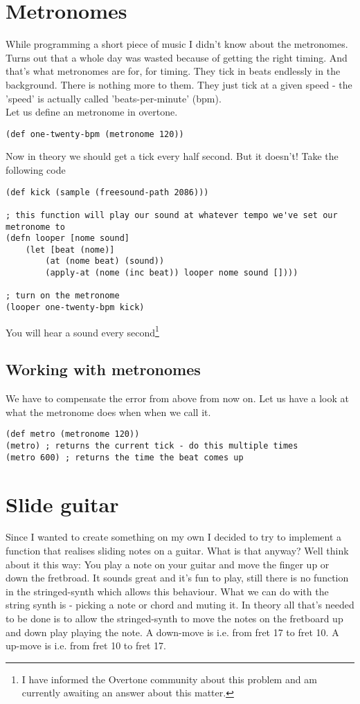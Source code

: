 \section{Metronomes}
While programming a short piece of music I didn't know about the metronomes. Turns out that a whole day was wasted because of getting the right timing. And that's what metronomes are for, for timing. They tick in beats endlessly in the background. There is nothing more to them. They just tick at a given speed - the 'speed' is actually called 'beats-per-minute' (bpm).\\
Let us define an metronome in overtone.
\begin{lstlisting}
(def one-twenty-bpm (metronome 120))
\end{lstlisting}
Now in theory we should get a tick every half second. But it doesn't!
Take the following code
\begin{lstlisting}
(def kick (sample (freesound-path 2086)))

; this function will play our sound at whatever tempo we've set our metronome to 
(defn looper [nome sound]    
    (let [beat (nome)]
        (at (nome beat) (sound))
        (apply-at (nome (inc beat)) looper nome sound [])))

; turn on the metronome
(looper one-twenty-bpm kick)
\end{lstlisting}

You will hear a sound every second\footnote{I have informed the Overtone community about this problem and am currently awaiting an answer about this matter.}

\subsection{Working with metronomes}
We have to compensate the error from above from now on. Let us have a look at what the metronome does when when we call it.
\begin{lstlisting}
(def metro (metronome 120))
(metro) ; returns the current tick - do this multiple times
(metro 600) ; returns the time the beat comes up
\end{lstlisting}

\section{Slide guitar}
Since I wanted to create something on my own I decided to try to implement a function that realises sliding notes on a guitar. What is that anyway? Well think about it this way: You play a note on your guitar and move the finger up or down the fretbroad. It sounds great and it's fun to play, still there is no function in the stringed-synth which allows this behaviour. What we can do with the string synth is - picking a note or chord and muting it. In theory all that's needed to be done is to allow the stringed-synth to move the notes on the fretboard up and down play playing the note.
A down-move is i.e. from fret 17 to fret 10. A up-move is i.e. from fret 10 to fret 17.\\

